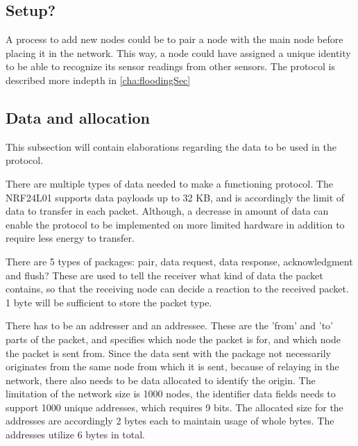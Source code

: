 \subsection{Setup?}
A process to add new nodes could be to pair a node with the main node before placing it in the network. This way, a node could have assigned a unique identity to be able to recognize its sensor readings from other sensors. 
The protocol is described more indepth in \ref{cha:floodingSec}




\subsection{Data and allocation}
This subsection will contain elaborations regarding the data to be used in the protocol.

There are multiple types of data needed to make a functioning protocol. The NRF24L01 supports data payloads up to 32 KB, and is accordingly the limit of data to transfer in each packet. Although, a decrease in amount of data can enable the protocol to be implemented on more limited hardware in addition to require less energy to transfer.

There are 5 types of packages: pair, data request, data response, acknowledgment and flush? These are used to tell the receiver what kind of data the packet contains, so that the receiving node can decide a reaction to the received packet. 1 byte will be sufficient to store the packet type.

There has to be an addresser and an addressee. These are the 'from' and 'to' parts of the packet, and specifies which node the packet is for, and which node the packet is sent from. Since the data sent with the package not necessarily originates from the same node from which it is sent, because of relaying in the network, there also needs to be data allocated to identify the origin. The limitation of the network size is 1000 nodes, the identifier data fields needs to support 1000 unique addresses, which requires 9 bits. The allocated size for the addresses are accordingly 2 bytes each to maintain usage of whole bytes. The addresses utilize 6 bytes in total.

